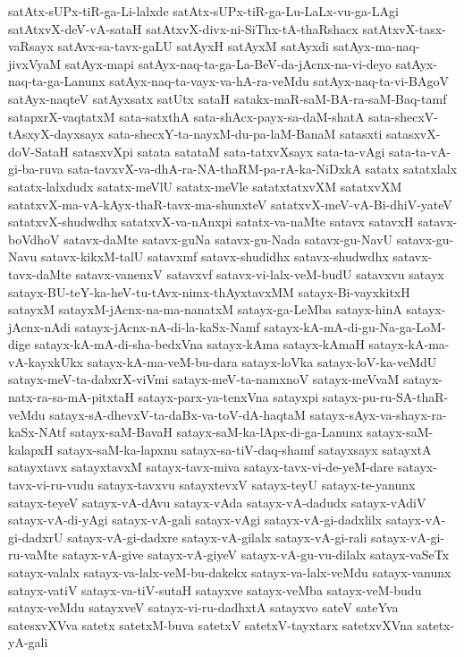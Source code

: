 {satAtx-sUPx-tiR-ga-Li-lalxde
satAtx-sUPx-tiR-ga-Lu-LaLx-vu-ga-LAgi
satAtxvX-deV-vA-sataH
satAtxvX-divx-ni-SiThx-tA-thaRshacx
satAtxvX-tasx-vaRsayx
satAvx-sa-tavx-gaLU
satAyxH
satAyxM
satAyxdi
satAyx-ma-naq-jivxVyaM
satAyx-mapi
satAyx-naq-ta-ga-La-BeV-da-jAcnx-na-vi-deyo
satAyx-naq-ta-ga-Lanunx
satAyx-naq-ta-vayx-va-hA-ra-veMdu
satAyx-naq-ta-vi-BAgoV
satAyx-naqteV
satAyxsatx
satUtx
sataH
satakx-maR-saM-BA-ra-saM-Baq-tamf
satapxrX-vaqtatxM
sata-satxthA
sata-shAcx-payx-sa-daM-shatA
sata-shecxV-tAsxyX-dayxsayx
sata-shecxY-ta-nayxM-du-pa-laM-BanaM
satasxti
satasxvX-doV-SataH
satasxvXpi
satata
satataM
sata-tatxvXsayx
sata-ta-vAgi
sata-ta-vA-gi-ba-ruva
sata-tavxvX-va-dhA-ra-NA-thaRM-pa-rA-ka-NiDxkA
satatx
satatxlalx
satatx-lalxdudx
satatx-meVlU
satatx-meVle
satatxtatxvXM
satatxvXM
satatxvX-ma-vA-kAyx-thaR-tavx-ma-shunxteV
satatxvX-meV-vA-Bi-dhiV-yateV
satatxvX-shudwdhx
satatxvX-va-nAnxpi
satatx-va-naMte
satavx
satavxH
satavx-boVdhoV
satavx-daMte
satavx-guNa
satavx-gu-Nada
satavx-gu-NavU
satavx-gu-Navu
satavx-kikxM-talU
satavxmf
satavx-shudidhx
satavx-shudwdhx
satavx-tavx-daMte
satavx-vanenxV
satavxvf
satavx-vi-lalx-veM-budU
satavxvu
satayx
satayx-BU-teY-ka-heV-tu-tAvx-nimx-thAyxtavxMM
satayx-Bi-vayxkitxH
satayxM
satayxM-jAcnx-na-ma-nanatxM
satayx-ga-LeMba
satayx-hinA
satayx-jAcnx-nAdi
satayx-jAcnx-nA-di-la-kaSx-Namf
satayx-kA-mA-di-gu-Na-ga-LoM-dige
satayx-kA-mA-di-sha-bedxVna
satayx-kAma
satayx-kAmaH
satayx-kA-ma-vA-kayxkUkx
satayx-kA-ma-veM-bu-dara
satayx-loVka
satayx-loV-ka-veMdU
satayx-meV-ta-dabxrX-viVmi
satayx-meV-ta-namxnoV
satayx-meVvaM
satayx-natx-ra-sa-mA-pitxtaH
satayx-parx-ya-tenxVna
satayxpi
satayx-pu-ru-SA-thaR-veMdu
satayx-sA-dhevxV-ta-daBx-va-toV-dA-haqtaM
satayx-sAyx-va-shayx-ra-kaSx-NAtf
satayx-saM-BavaH
satayx-saM-ka-lApx-di-ga-Lanunx
satayx-saM-kalapxH
satayx-saM-ka-lapxnu
satayx-sa-tiV-daq-shamf
satayxsayx
satayxtA
satayxtavx
satayxtavxM
satayx-tavx-miva
satayx-tavx-vi-de-yeM-dare
satayx-tavx-vi-ru-vudu
satayx-tavxvu
satayxtevxV
satayx-teyU
satayx-te-yanunx
satayx-teyeV
satayx-vA-dAvu
satayx-vAda
satayx-vA-dadudx
satayx-vAdiV
satayx-vA-di-yAgi
satayx-vA-gali
satayx-vAgi
satayx-vA-gi-dadxlilx
satayx-vA-gi-dadxrU
satayx-vA-gi-dadxre
satayx-vA-gilalx
satayx-vA-gi-rali
satayx-vA-gi-ru-vaMte
satayx-vA-give
satayx-vA-giyeV
satayx-vA-gu-vu-dilalx
satayx-vaSeTx
satayx-valalx
satayx-va-lalx-veM-bu-dakekx
satayx-va-lalx-veMdu
satayx-vanunx
satayx-vatiV
satayx-va-tiV-sutaH
satayxve
satayx-veMba
satayx-veM-budu
satayx-veMdu
satayxveV
satayx-vi-ru-dadhxtA
satayxvo
sateV
sateYva
satesxvXVva
satetx
satetxM-buva
satetxV
satetxV-tayxtarx
satetxvXVna
satetx-yA-gali
}
